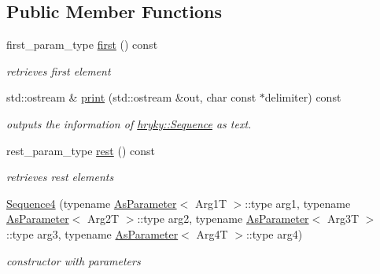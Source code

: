 \subsection*{Public Member Functions}
\begin{DoxyCompactItemize}
\item 
\hypertarget{classhryky_1_1_sequence_a881ed830dc76f92d29fe8feea122339b}{first\-\_\-param\-\_\-type \hyperlink{classhryky_1_1_sequence_a881ed830dc76f92d29fe8feea122339b}{first} () const}\label{classhryky_1_1_sequence_a881ed830dc76f92d29fe8feea122339b}

\begin{DoxyCompactList}\small\item\em retrieves first element \end{DoxyCompactList}\item 
\hypertarget{classhryky_1_1_sequence_a8443de2eb918764c345a86b40dd888db}{std\-::ostream \& \hyperlink{classhryky_1_1_sequence_a8443de2eb918764c345a86b40dd888db}{print} (std\-::ostream \&out, char const $\ast$delimiter) const}\label{classhryky_1_1_sequence_a8443de2eb918764c345a86b40dd888db}

\begin{DoxyCompactList}\small\item\em outputs the information of \hyperlink{classhryky_1_1_sequence}{hryky\-::\-Sequence} as text. \end{DoxyCompactList}\item 
\hypertarget{classhryky_1_1_sequence_a11e616cd4cfe41751bbaa350fca3dcb1}{rest\-\_\-param\-\_\-type \hyperlink{classhryky_1_1_sequence_a11e616cd4cfe41751bbaa350fca3dcb1}{rest} () const}\label{classhryky_1_1_sequence_a11e616cd4cfe41751bbaa350fca3dcb1}

\begin{DoxyCompactList}\small\item\em retrieves rest elements \end{DoxyCompactList}\item 
\hypertarget{classhryky_1_1_sequence4_af3dd49d3f0e7a40b6b0334e54e8c3bc5}{\hyperlink{classhryky_1_1_sequence4_af3dd49d3f0e7a40b6b0334e54e8c3bc5}{Sequence4} (typename \hyperlink{classhryky_1_1_as_parameter}{As\-Parameter}$<$ Arg1\-T $>$\-::type arg1, typename \hyperlink{classhryky_1_1_as_parameter}{As\-Parameter}$<$ Arg2\-T $>$\-::type arg2, typename \hyperlink{classhryky_1_1_as_parameter}{As\-Parameter}$<$ Arg3\-T $>$\-::type arg3, typename \hyperlink{classhryky_1_1_as_parameter}{As\-Parameter}$<$ Arg4\-T $>$\-::type arg4)}\label{classhryky_1_1_sequence4_af3dd49d3f0e7a40b6b0334e54e8c3bc5}

\begin{DoxyCompactList}\small\item\em constructor with parameters \end{DoxyCompactList}\end{DoxyCompactItemize}


